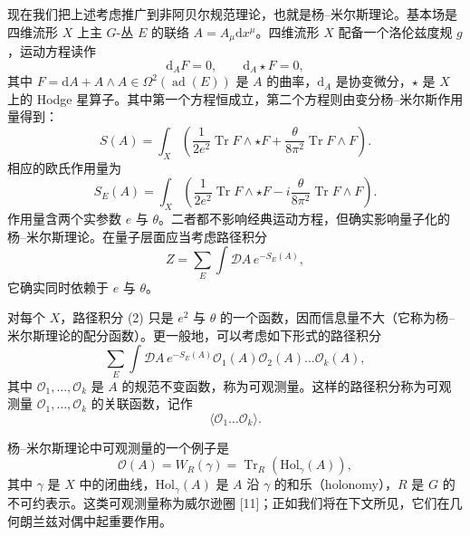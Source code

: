 \documentclass[11pt,a4paper,UTF8]{ctexart}
\begin{document}
现在我们把上述考虑推广到非阿贝尔规范理论，也就是杨–米尔斯理论。基本场是四维流形 $X$ 上主 $G$-丛 $E$ 的联络 $A=A_{\mu}\mathrm{d}x^{\mu}$。四维流形 $X$ 配备一个洛伦兹度规 $g$，运动方程读作
\[
    \mathrm{d}_{A}F=0,\qquad \mathrm{d}_{A}\star F=0,
\]
其中 $F=\mathrm{d}A+A\wedge A\in\Omega^{2}(\operatorname{ad}(E))$ 是 $A$ 的曲率，$\mathrm{d}_{A}$ 是协变微分，$\star$ 是 $X$ 上的 Hodge 星算子。其中第一个方程恒成立，第二个方程则由变分杨–米尔斯作用量得到：
\[
    S(A)=\int_{X}\left(\frac{1}{2e^{2}}\operatorname{Tr}F\wedge\star F+\frac{\theta}{8\pi^{2}}\operatorname{Tr}F\wedge F\right).
\]
相应的欧氏作用量为
\[
    S_{E}(A)=\int_{X}\left(\frac{1}{2e^{2}}\operatorname{Tr}F\wedge\star F-i\frac{\theta}{8\pi^{2}}\operatorname{Tr}F\wedge F\right).
\]
作用量含两个实参数 $e$ 与 $\theta$。二者都不影响经典运动方程，但确实影响量子化的杨–米尔斯理论。在量子层面应当考虑路径积分
\begin{equation}
    Z=\sum_{E}\int\mathcal{D}A\,e^{-S_{E}(A)}, \tag{2}
\end{equation}
它确实同时依赖于 $e$ 与 $\theta$。

对每个 $X$，路径积分 (2) 只是 $e^{2}$ 与 $\theta$ 的一个函数，因而信息量不大（它称为杨–米尔斯理论的配分函数）。更一般地，可以考虑如下形式的路径积分
\[
    \sum_{E}\int\mathcal{D}A\,e^{-S_{E}(A)}\mathcal{O}_{1}(A)\mathcal{O}_{2}(A)\ldots\mathcal{O}_{k}(A),
\]
其中 $\mathcal{O}_{1},\ldots,\mathcal{O}_{k}$ 是 $A$ 的规范不变函数，称为可观测量。这样的路径积分称为可观测量 $\mathcal{O}_{1},\ldots,\mathcal{O}_{k}$ 的关联函数，记作
\[
    \langle\mathcal{O}_{1}\ldots\mathcal{O}_{k}\rangle.
\]

杨–米尔斯理论中可观测量的一个例子是
\[
    \mathcal{O}(A)=W_{R}(\gamma)=\operatorname{Tr}_{R}(\mathrm{Hol}_{\gamma}(A)),
\]
其中 $\gamma$ 是 $X$ 中的闭曲线，$\mathrm{Hol}_{\gamma}(A)$ 是 $A$ 沿 $\gamma$ 的和乐（holonomy），$R$ 是 $G$ 的不可约表示。这类可观测量称为威尔逊圈 [11]；正如我们将在下文所见，它们在几何朗兰兹对偶中起重要作用。
\end{document}
